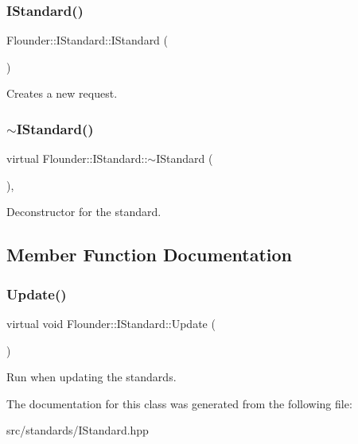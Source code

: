 \subsubsection{\texorpdfstring{I\+Standard()}{IStandard()}}
{\footnotesize\ttfamily Flounder\+::\+I\+Standard\+::\+I\+Standard (\begin{DoxyParamCaption}{ }\end{DoxyParamCaption})\hspace{0.3cm}{\ttfamily [inline]}}



Creates a new request. 

\mbox{\label{class_flounder_1_1_i_standard_ad43f304ece0273eb0f3ddcea1f4e8472}} 
\subsubsection{\texorpdfstring{$\sim$\+I\+Standard()}{~IStandard()}}
{\footnotesize\ttfamily virtual Flounder\+::\+I\+Standard\+::$\sim$\+I\+Standard (\begin{DoxyParamCaption}{ }\end{DoxyParamCaption})\hspace{0.3cm}{\ttfamily [inline]}, {\ttfamily [virtual]}}



Deconstructor for the standard. 



\subsection{Member Function Documentation}
\mbox{\label{class_flounder_1_1_i_standard_aaf59f5b41de0afc23bd031067e367b5a}} 
\subsubsection{\texorpdfstring{Update()}{Update()}}
{\footnotesize\ttfamily virtual void Flounder\+::\+I\+Standard\+::\+Update (\begin{DoxyParamCaption}{ }\end{DoxyParamCaption})\hspace{0.3cm}{\ttfamily [pure virtual]}}



Run when updating the standards. 



The documentation for this class was generated from the following file\+:\begin{DoxyCompactItemize}
\item 
src/standards/I\+Standard.\+hpp\end{DoxyCompactItemize}

